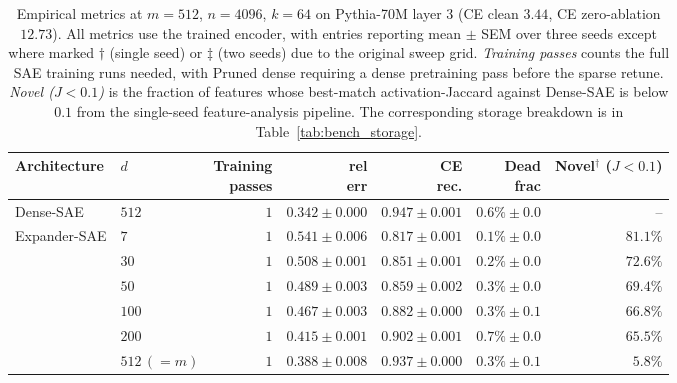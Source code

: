 \documentclass{article}
\theoremstyle{plain}
\theoremstyle{definition}
\theoremstyle{remark}
\begin{document}
\begin{table}[h]
    \centering
    \caption{Empirical metrics at $m{=}512$, $n{=}4096$, $k{=}64$ on Pythia-70M layer 3 (CE clean $3.44$, CE zero-ablation $12.73$). All metrics use the trained encoder, with entries reporting mean $\pm$ SEM over three seeds except where marked $\dagger$ (single seed) or $\ddagger$ (two seeds) due to the original sweep grid. \emph{Training passes} counts the full SAE training runs needed, with Pruned dense requiring a dense pretraining pass before the sparse retune. \emph{Novel ($J{<}0.1$)} is the fraction of features whose best-match activation-Jaccard against Dense-SAE is below $0.1$ from the single-seed feature-analysis pipeline. The corresponding storage breakdown is in Table~\ref{tab:bench_storage}.}
    \label{tab:bench_practical}
    \small
    \setlength{\tabcolsep}{5pt}
    \begin{tabular}{llrrrrr}
        \toprule
        Architecture & $d$ & \shortstack{Training\\passes} & \shortstack{rel\\err} & \shortstack{CE\\rec.} & \shortstack{Dead\\frac} & \shortstack{Novel$^\dagger$\\($J{<}0.1$)} \\
        \midrule
        Dense-SAE                & $512$       & $1$          & $0.342{\pm}0.000$ & $0.947{\pm}0.001$ & $0.6\%{\pm}0.0$  & --                \\
        \midrule
        \multirow{6}{*}{Expander-SAE}
                                 & $7$         & $1$          & $0.541{\pm}0.006$ & $0.817{\pm}0.001$ & $0.1\%{\pm}0.0$  & $\mathbf{81.1\%}$ \\
                                 & $30$        & $1$          & $0.508{\pm}0.001$ & $0.851{\pm}0.001$ & $0.2\%{\pm}0.0$  & $72.6\%$          \\
                                 & $50$        & $1$          & $0.489{\pm}0.003$ & $0.859{\pm}0.002$ & $0.3\%{\pm}0.0$  & $69.4\%$          \\
                                 & $100$       & $1$          & $0.467{\pm}0.003$ & $0.882{\pm}0.000$ & $0.3\%{\pm}0.1$  & $66.8\%$          \\
                                 & $200$       & $1$          & $0.415{\pm}0.001$ & $0.902{\pm}0.001$ & $0.7\%{\pm}0.0$  & $65.5\%$          \\
                                 & $512\,(=m)$ & $1$          & $0.388{\pm}0.008$ & $0.937{\pm}0.000$ & $0.3\%{\pm}0.1$  & $5.8\%$           \\

\end{tabular}
\end{table}
\end{document}
